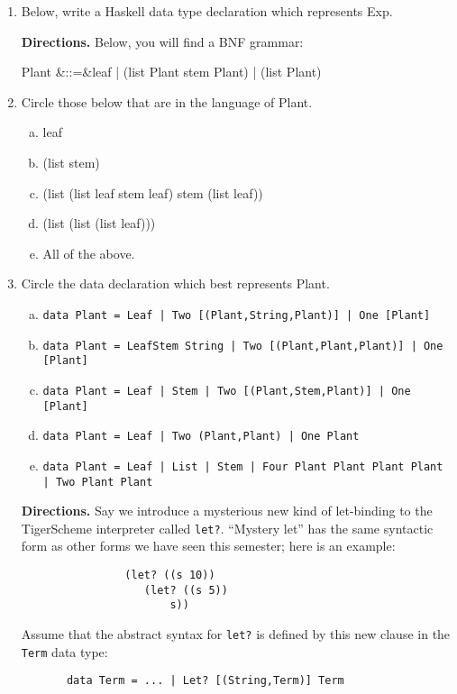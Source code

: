 \documentclass[12pt]{article}
\begin{document}
\begin{enumerate}
\item Below, write a Haskell data type declaration which represents \<Exp\>.

\newpage

{\bf Directions.} Below, you will find a BNF grammar:
\begin{haskell}
Plant &::=&\relax leaf | (list Plant stem Plant) | (list Plant)
\end{haskell}

\item Circle those below that are in the language of \<Plant\>.
\begin{enumerate}[(a)]
\item \<leaf\>
\item \<(list stem)\>
\item \<(list (list leaf stem leaf) stem (list leaf))\>
\item \<(list (list (list leaf)))\>
\item All of the above.
\end{enumerate}

\item Circle the data declaration which best represents \<Plant\>.
\begin{enumerate}[(a)]
\item \verb+data Plant = Leaf | Two [(Plant,String,Plant)] | One [Plant]+
\item \verb+data Plant = LeafStem String | Two [(Plant,Plant,Plant)] | One [Plant]+
\item \verb+data Plant = Leaf | Stem | Two [(Plant,Stem,Plant)] | One [Plant]+
\item \verb+data Plant = Leaf | Two (Plant,Plant) | One Plant+
\item \verb+data Plant = Leaf | List | Stem | Four Plant Plant Plant Plant | Two Plant Plant+
\end{enumerate}

\newpage


{\bf Directions.} Say we introduce a mysterious new kind of let-binding to the TigerScheme interpreter called \verb+let?+.  ``Mystery let'' has the same syntactic form as other forms we have seen this semester; here is an example:
\begin{verbatim}
                (let? ((s 10)) 
                   (let? ((s 5))
                       s))
\end{verbatim}
Assume that the abstract syntax for \verb+let?+ is defined by this new clause in the \verb+Term+ data type: 
\begin{verbatim}
       data Term = ... | Let? [(String,Term)] Term
\end{verbatim}


\end{enumerate}
\end{document}
